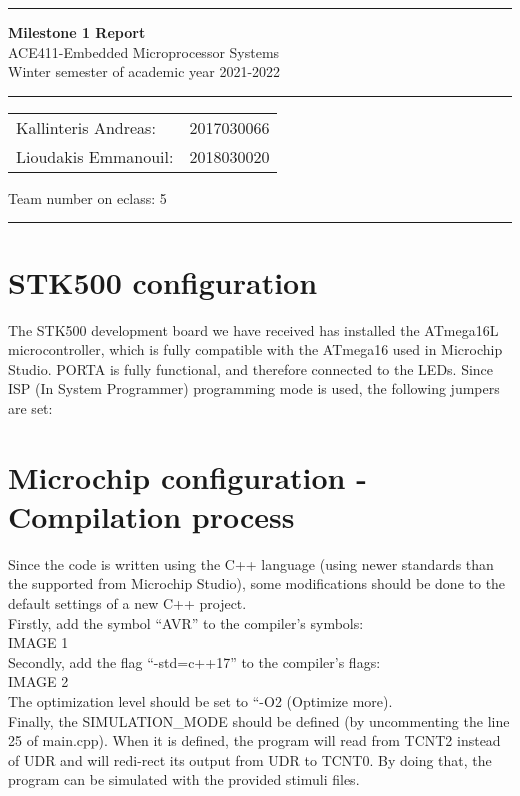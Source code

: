 \documentclass[12pt, a4]{article}
\begin{document}
\noindent \rule{\textwidth}{3pt}
\begin{center}
	{\bf \Large{Milestone 1 Report}}\\
	ACE411-Embedded Microprocessor Systems \\
	Winter semester of academic year 2021-2022
	\rule{\textwidth}{0.2mm} 
	\begin{tabular}{l r}
		Kallinteris Andreas:& 2017030066 \\ 
		Lioudakis Emmanouil:      &2018030020 
	\end{tabular} \vrule \hspace{3mm}
	\indent	Team number on eclass:  5
	\rule{\textwidth}{1pt}
\end{center}

\section*{STK500 configuration}
The STK500 development board we have received has installed the ATmega16L microcontroller, which is fully compatible with the ATmega16 used in Microchip Studio. PORTA is fully functional, and therefore connected to the LEDs. Since ISP (In System Programmer) programming mode is used, the following jumpers are set:



\section*{Microchip configuration - Compilation process}
Since the code is written using the C++ language (using newer standards than the supported from Microchip Studio), some modifications should be done to the default settings of a new C++ project.  \\
Firstly, add the symbol “AVR” to the compiler’s symbols:\\
IMAGE 1\\
Secondly, add the flag “-std=c++17” to the compiler’s flags:\\
IMAGE 2\\
The optimization level should be set to “-O2 (Optimize more).\\
Finally, the SIMULATION\_MODE should be defined (by uncommenting the line 25 of main.cpp). When it is defined, the program will read from TCNT2 instead of UDR and will redi-rect its output from UDR to TCNT0. By doing that, the program can be simulated with the provided stimuli files.
\end{document}
